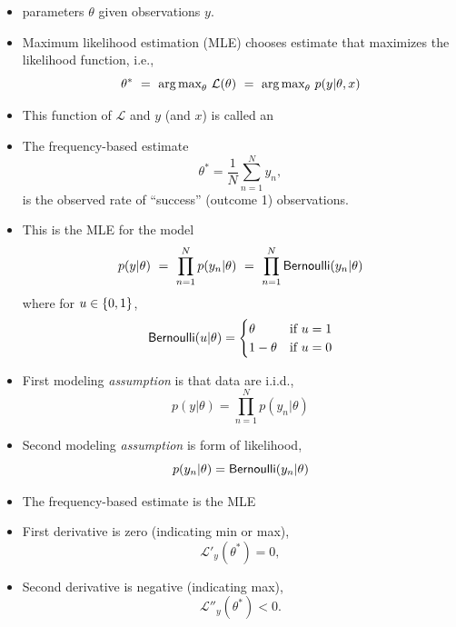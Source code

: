 \documentclass[10pt]{report}
\begin{document}
\begin{itemize}
\item {} parameters $\theta$ given observations $y$.
\item Maximum likelihood estimation (MLE) chooses 
estimate that maximizes the likelihood function, i.e.,
\[
\theta^* 
\ = \ \mbox{arg\,max}_{\theta} \ \mathcal{L}(\theta) 
\ = \ \mbox{arg\,max}_{\theta} \ p(y|\theta,x)
\]
\item This function of $\mathcal{L}$ and $y$ (and $x$) is called an 
\end{itemize}

%
\begin{itemize}
\item The frequency-based estimate 
\[
\theta^{*} = \frac{1}{N} \sum_{n=1}^N y_n, 
\]
is the observed rate of ``success'' (outcome 1) observations.
\item This is the MLE for the model
\[
p(y|\theta) 
\ = \ \prod_{n=1}^N p(y_n|\theta) 
\ = \  \prod_{n=1}^N \text{\sf Bernoulli}(y_n|\theta) 
\]
where for $u \in \{ 0,1 \}$, 
{\small
\[
\text{\sf Bernoulli}(u|\theta) = 
\begin{cases}
\theta & \text{if } u = 1 
\\
1 - \theta & \text{if } u = 0
\end{cases}
\]
}
\end{itemize}

\vspace*{-4pt}
\begin{itemize}
\item First modeling \emph{assumption} is that data are i.i.d.,
\[
p(y|\theta) = \prod_{n=1}^N p(y_n|\theta)
\] 
\item Second modeling \emph{assumption} is form of likelihood,
\[
p(y_n|\theta) = \text{\sf Bernoulli}(y_n|\theta)
\]
\end{itemize}

\begin{itemize}
\item The frequency-based estimate is the MLE
\item First derivative is zero (indicating min or max),
\[
\mathcal{L}'_y(\theta^*) = 0,
\]
\item Second derivative is negative (indicating max),
\[
\mathcal{L}''_y(\theta^*) < 0.
\]
\end{itemize}
\end{document}
